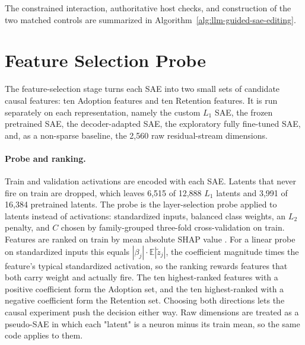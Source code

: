 The constrained interaction, authoritative host checks, and construction of
the two matched controls are summarized in
Algorithm~\ref{alg:llm-guided-sae-editing}.


\section{Feature Selection Probe}
\label{sec:feature-selection}

The feature-selection stage turns each SAE into two small sets of candidate
causal features: ten Adoption features and ten Retention features. It is run
separately on each representation, namely the custom $L_1$ SAE, the frozen
pretrained SAE, the decoder-adapted SAE, the exploratory fully fine-tuned SAE,
and, as a non-sparse baseline, the 2,560 raw residual-stream dimensions.

\paragraph{Probe and ranking.} Train and validation activations are encoded
with each SAE. Latents that never fire on train are dropped, which leaves 6,515
of 12,888 $L_1$ latents and 3,991 of 16,384 pretrained latents. The probe is
the layer-selection probe applied to latents instead of activations:
standardized inputs, balanced class weights, an $L_2$ penalty, and $C$ chosen
by family-grouped three-fold cross-validation on train. Features are ranked on
train by mean absolute SHAP value \cite{lundberg2017shap}. For a linear probe on
standardized inputs this equals $|\beta_j|\cdot\mathbb{E}|\tilde z_j|$, the
coefficient magnitude times the feature's typical standardized activation, so
the ranking rewards features that both carry weight and actually fire. The ten
highest-ranked features with a positive coefficient form the Adoption set, and
the ten highest-ranked with a negative coefficient form the Retention set.
Choosing both directions lets the causal experiment push the decision either
way. Raw dimensions are treated as a pseudo-SAE in which each "latent" is a
neuron minus its train mean, so the same code applies to them.

